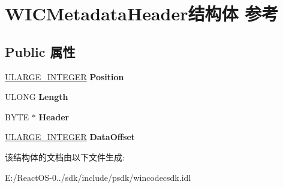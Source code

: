 \hypertarget{struct_w_i_c_metadata_header}{}\section{W\+I\+C\+Metadata\+Header结构体 参考}
\label{struct_w_i_c_metadata_header}
\subsection*{Public 属性}
\begin{DoxyCompactItemize}
\item 
\mbox{\label{struct_w_i_c_metadata_header_a0a9982a87073e6369527101ac88eb1fb}} 
\hyperlink{struct___u_l_a_r_g_e___i_n_t_e_g_e_r}{U\+L\+A\+R\+G\+E\+\_\+\+I\+N\+T\+E\+G\+ER} {\bfseries Position}
\item 
\mbox{\label{struct_w_i_c_metadata_header_aea6a3b8811eb6f2f2d399190b90ee0cd}} 
U\+L\+O\+NG {\bfseries Length}
\item 
\mbox{\label{struct_w_i_c_metadata_header_af4e5830efd3aab1fff45f7ec2609b2d3}} 
B\+Y\+TE $\ast$ {\bfseries Header}
\item 
\mbox{\label{struct_w_i_c_metadata_header_a9730ea480a807936c2aa8de4a31593bc}} 
\hyperlink{struct___u_l_a_r_g_e___i_n_t_e_g_e_r}{U\+L\+A\+R\+G\+E\+\_\+\+I\+N\+T\+E\+G\+ER} {\bfseries Data\+Offset}
\end{DoxyCompactItemize}


该结构体的文档由以下文件生成\+:\begin{DoxyCompactItemize}
\item 
E\+:/\+React\+O\+S-\/0../sdk/include/psdk/wincodecsdk.\+idl\end{DoxyCompactItemize}
